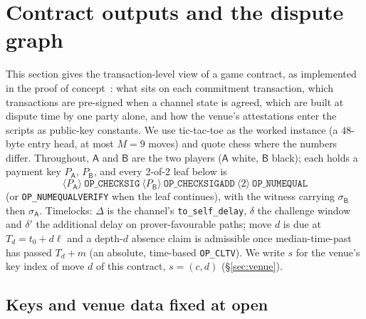 \documentclass[11pt]{article}
\newcommand{\op}[1]{\texttt{OP\_#1}}
\newcommand{\push}[1]{\ensuremath{\langle #1\rangle}}
\newcommand{\Pa}{\mathsf{A}}
\newcommand{\Pb}{\mathsf{B}}
\newcommand{\tsd}{\Delta}
\newcommand{\dl}{\delta}
\newcommand{\dlp}{\delta'}
\begin{document}
\section{Contract outputs and the dispute graph}
\label{sec:graph}

This section gives the transaction-level view of a game contract, as
implemented in the proof of concept~\cite{lngapcode}: what
sits on each commitment transaction, which transactions are pre-signed
when a channel state is agreed, which are built at dispute time by one
party alone, and how the venue's attestations enter the scripts as
public-key constants. We use tic-tac-toe as the worked instance
(a $48$-byte entry head, at most $M=9$ moves) and quote chess where the
numbers differ. Throughout, $\Pa$ and $\Pb$ are the two players ($\Pa$
white, $\Pb$ black); each holds a payment key $P_\Pa$, $P_\Pb$, and every 2-of-2 leaf below is
\[
  \push{P_\Pa}\ \op{CHECKSIG}\ \push{P_\Pb}\ \op{CHECKSIGADD}\ \push{2}\ \op{NUMEQUAL}
\]
(or \op{NUMEQUALVERIFY} when the leaf continues), with the witness
carrying $\sigma_\Pb$ then $\sigma_\Pa$. Timelocks: $\tsd$ is the
channel's \texttt{to\_self\_delay}, $\dl$ the challenge window and
$\dlp$ the additional delay on prover-favourable paths; move $d$ is due
at $T_d = t_0 + d\ell$ and a depth-$d$ absence claim is admissible once
median-time-past has passed $T_d + m$ (an absolute, time-based
\op{CLTV}). We write $s$ for the venue's key index of move $d$ of this
contract, $s = (c, d)$ (\S\ref{sec:venue}).

\subsection{Keys and venue data fixed at open}
\label{sec:graph:keys}
\end{document}
